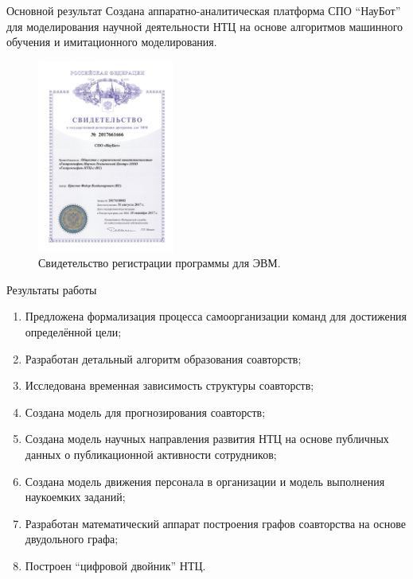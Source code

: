 \documentclass{beamer}
\begin{document}
\begin{frame}{Основной результат}
	Создана аппаратно-аналитическая платформа СПО ``НауБот'' для моделирования научной деятельности НТЦ на основе алгоритмов машинного обучения и имитационного моделирования. 
	\begin{figure}
		\includegraphics[width=0.4\textwidth]{media/naubot.pdf}
		\caption{\label{fig:naubot} Свидетельство регистрации программы для ЭВМ.}
	\end{figure}
	
\end{frame}


\begin{frame}{Результаты работы}
	\begin{enumerate}
		\item Предложена формализация процесса самоорганизации команд для достижения определённой цели;
		\item Разработан детальный алгоритм образования соавторств;
		\item Исследована временная зависимость структуры соавторств;
		\item Создана модель для прогнозирования соавторств;
		\item Создана модель научных направления развития НТЦ на основе публичных данных о публикационной активности сотрудников;
		\item Создана модель движения персонала в организации и модель выполнения наукоемких заданий;
		\item Разработан математический аппарат построения графов соавторства на основе двудольного графа;
		\item Построен ``цифровой двойник'' НТЦ.
	\end{enumerate}
\end{frame}
\end{document}
